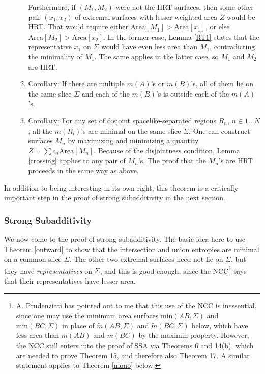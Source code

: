 \documentclass[12pt]{article}
\begin{document}
\begin{enumerate}[resume]
\begin{enumerate}
Furthermore, if $(M_1, M_2)$ were not the HRT surfaces, then some other pair $(x_1, x_2)$ of extremal surfaces with lesser weighted area $Z$ would be HRT.  That would require either $\mathrm{Area}[M_1] > \mathrm{Area}[x_1]$, or else $\mathrm{Area}[M_2] > \mathrm{Area}[x_2]$.  In the former case, Lemma \ref{RT1} states that the representative $\tilde{x}_1$ on $\Sigma$ would have even less area than $M_1$, contradicting the minimality of $M_1$.  The same applies in the latter case, so $M_1$ and $M_2$ are HRT.
	\item Corollary: If there are multiple $m(A)$'s or $m(B)$'s, all of them lie on the same slice $\Sigma$ and each of the $m(B)$'s is outside each of the $m(A)$'s.
	\item \label{multiR} Corollary: For any set of disjoint spacelike-separated regions $R_n$, $n \in 1...N$, all the $m(R_i)$'s are minimal on the same slice $\Sigma$.  One can construct surfaces $M_n$ by maximizing and minimizing a quantity $Z = \sum c_n \mathrm{Area}[M_n]$.  Because of the disjointness condition, Lemma \ref{crossing} applies to any pair of $M_n$'s.  The proof that the $M_n$'s are HRT proceeds in the same way as above.
	\end{enumerate}
\end{enumerate}
In addition to being interesting in its own right, this theorem is a critically important step in the proof of strong subadditivity in the next section.

\subsubsection{Strong Subadditivity}\label{STR}

We now come to the proof of strong subadditivity.  The basic idea here to use Theorem \ref{outward} to show that the intersection and union entropies are minimal on a common slice $\Sigma$.  The other two extremal surfaces need not lie on $\Sigma$, but they have \emph{representatives} on $\Sigma$, and this is good enough, since the NCC\footnote{A. Prudenziati has pointed out to me that this use of the NCC is inessential, since one may use the minimum area surfaces $\text{min}(AB, \Sigma)$ and $\text{min}(BC,\Sigma)$ in place of $\tilde{m}(AB,\Sigma)$ and $\tilde{m}(BC,\Sigma)$ below, which have less area than $m(AB)$ and $m(BC)$ by the maximin property.  However, the NCC still enters into the proof of SSA via Theorems 6 and 14(b), which are needed to prove Theorem 15, and therefore also Theorem 17.  A similar statement applies to Theorem \ref{mono} below.} says that their representatives have lesser area.
\end{document}
